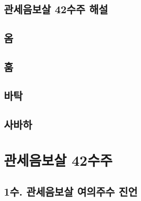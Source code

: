 \documentclass[12pt, a4paper, oneside]{book}
\let\stdsection\section
\renewcommand\section{\newpage\stdsection}
\begin{document}
	\section{ 관세음보살 42수주 해설}



	\section{ 옴 }


	\section{ 훔 }



	\section{ 바탁 }



	\section{ 사바하 }






	\chapter{관세음보살 42수주}


		\newpage
		\minitoc				%




\section{1수. 관세음보살 여의주수 진언}
\end{document}
